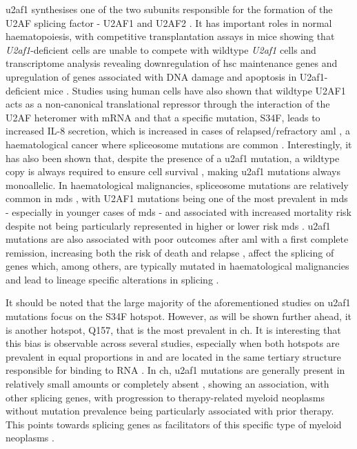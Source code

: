 \Ac{u2af1} synthesises one of the two subunits responsible for the formation of the U2AF splicing factor - U2AF1 and U2AF2 \cite{Palangat2019-nv}. It has important roles in normal haematopoiesis, with competitive transplantation assays in mice showing that \textit{U2af1}-deficient cells are unable to compete with wildtype \textit{U2af1} cells and transcriptome analysis revealing downregulation of \ac{hsc} maintenance genes and upregulation of genes associated with DNA damage and apoptosis in U2af1-deficient mice \cite{Dutta2020-ah}. Studies using human cells have also shown that wildtype U2AF1 acts as a non-canonical translational repressor through the interaction of the U2AF heteromer with mRNA and that a specific mutation, S34F, leads to increased IL-8 secretion, which is increased in cases of relapsed/refractory \ac{aml} \cite{Palangat2019-nv}, a haematological cancer where spliceosome mutations are common \cite{Papaemmanuil2016-jy}. Interestingly, it has also been shown that, despite the presence of a \ac{u2af1} mutation, a wildtype copy is always required to ensure cell survival \cite{Fei2016-cc,Wadugu2020-df}, making \ac{u2af1} mutations always monoallelic. In haematological malignancies, spliceosome mutations are relatively common in \ac{mds} \cite{Yoshida2011-zp}, with U2AF1 mutations being one of the most prevalent in \ac{mds} - especially in younger cases of \ac{mds} - and associated with increased mortality risk despite not being particularly represented in higher or lower risk \ac{mds} \cite{Li2018-vz}. \ac{u2af1} mutations are also associated with poor outcomes after \ac{aml} with a first complete remission, increasing both the risk of death and relapse \cite{Saygin2018-bb}, affect the splicing of genes which, among others, are typically mutated in haematological malignancies \cite{Przychodzen2013-vb} and lead to lineage specific alterations in splicing \cite{Yip2017-kf}. 

It should be noted that the large majority of the aforementioned studies on \ac{u2af1} mutations focus on the S34F hotspot. However, as will be shown further ahead, it is another hotspot, Q157, that is the most prevalent in \ac{ch}. It is interesting that this bias is observable across several studies, especially when both hotspots are prevalent in equal proportions in and are located in the same tertiary structure responsible for binding to RNA \cite{Adema2016-fa}. In \ac{ch}, \ac{u2af1} mutations are generally present in relatively small amounts or completely absent \cite{Bolton2020-ct,Jaiswal2014-rl,Genovese2014-eu,Xie2014-np}, showing an association, with other splicing genes, with progression to therapy-related myeloid neoplasms without mutation prevalence being particularly associated with prior therapy. This points towards splicing genes as facilitators of this specific type of myeloid neoplasms \cite{Bolton2020-ct}. 

